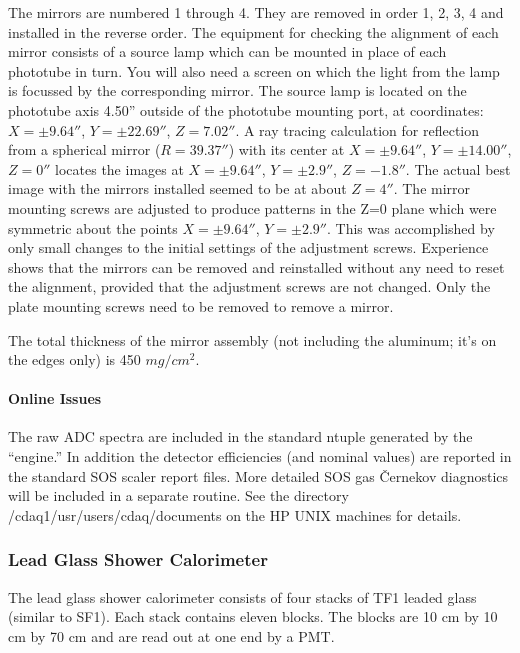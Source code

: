 	The mirrors are numbered 1 through 4.  They are removed in
order 1, 2, 3, 4 and installed in the reverse order.  The equipment
for checking the alignment of each mirror consists of a source lamp
which can be mounted in place of each phototube in turn.  You will
also need a screen on which the light from the lamp is focussed by the
corresponding mirror.  The source lamp is located on the phototube
axis 4.50'' outside of the phototube mounting port, at coordinates:
$X = \pm9.64''$, $Y = \pm22.69''$, $Z = 7.02''$.  A ray tracing
calculation for reflection from a spherical mirror ($R = 39.37''$)
with its center at $X = \pm9.64''$, $Y = \pm14.00''$, $Z = 0''$
locates the images at $X = \pm9.64''$, $Y = \pm2.9''$, $Z = -1.8''$.
The actual best image with the mirrors installed seemed to be at about
$Z = 4''$.  The mirror mounting screws are adjusted to produce
patterns in the Z=0 plane which were symmetric about the points $X =
\pm9.64''$, $Y = \pm2.9''$.  This was accomplished by only small
changes to the initial settings of the adjustment screws.  Experience
shows that the mirrors can be removed and reinstalled without any need
to reset the alignment, provided that the adjustment screws are not
changed.  Only the plate mounting screws need to be removed to remove
a mirror.

	The total thickness of the mirror assembly (not including the
aluminum; it's on the edges only) is 450 $mg/cm^{2}$.

\paragraph{Online Issues}

	The raw ADC spectra are included in the standard ntuple
generated by the ``engine.''  In addition the detector efficiencies
(and nominal values) are reported in the standard SOS scaler report
files.  More detailed SOS gas \v{C}ernekov diagnostics will be
included in a separate routine.  See the directory
/cdaq1/usr/users/cdaq/documents on the HP UNIX machines for details.


\subsubsection{Lead Glass Shower Calorimeter }

The lead glass shower calorimeter consists of four stacks of
TF1 leaded glass (similar to SF1). Each stack contains eleven
blocks. The blocks are 10 cm by 10 cm by 70 cm and are read
out at one end by a PMT.

